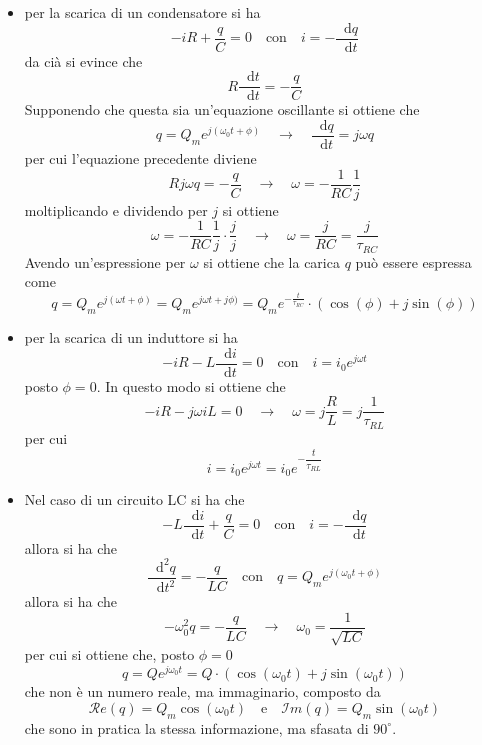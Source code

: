 \documentclass[a4paper]{extarticle}
\newcommand\dif{\mathop{}\!\mathrm{d}}
\begin{document}
\begin{itemize}
  \item per la scarica di un condensatore si ha
  \[-i R + \dfrac{q}{C} = 0 \hspace{1em} \text{con} \hspace{1em} i=-\dfrac{\dif q}{\dif t}\]
  da cià si evince che
  \[R \dfrac{\dif t}{\dif t} = - \dfrac{q}{C}\]
  Supponendo che questa sia un'equazione oscillante si ottiene che
  \[q=Q_m e^{j (\omega_0 t + \phi)} \hspace{1em} \rightarrow \hspace{1em} \dfrac{\dif q}{\dif t} = j\omega q\]
  per cui l'equazione precedente diviene
  \[R j \omega q= -\dfrac{q}{C} \hspace{1em} \rightarrow \hspace{1em} \omega=-\dfrac{1}{RC} \dfrac{1}{j}\]
  moltiplicando e dividendo per $j$ si ottiene
  \[\omega=-\dfrac{1}{RC} \dfrac{1}{j} \cdot \dfrac{j}{j} \hspace{1em} \rightarrow \hspace{1em} \omega=\dfrac{j}{RC}=\dfrac{j}{\tau_{RC}}\]
  Avendo un'espressione per $\omega$ si ottiene che la carica $q$ può essere espressa come
  \[q=Q_m e^{j(\omega t + \phi)} = Q_m e^{j\omega t + j\phi)} = Q_m e^{-\frac{t}{\tau_{RC}}} \cdot (\cos(\phi) + j \sin(\phi))\]

  \item per la scarica di un induttore si ha
  \[-iR - L \dfrac{\dif i}{\dif t} = 0 \hspace{1em} \text{con} \hspace{1em} i=i_0 e^{j \omega t}\]
  posto $\phi=0$. In questo modo si ottiene che
  \[-iR - j\omega i L = 0 \hspace{1em} \rightarrow \hspace{1em} \omega = j \dfrac{R}{L} = j \dfrac{1}{\tau_{RL}}\]
  per cui
  \[i=i_0 e^{j \omega t} = i_0 e^{-\dfrac{t}{\tau_{RL}}}\]

  \item Nel caso di un circuito LC si ha che
  \[-L \dfrac{\dif i}{\dif t} + \dfrac{q}{C} = 0 \hspace{1em} \text{con} \hspace{1em} i=-\dfrac{\dif q}{\dif t}\]
  allora si ha che
  \[\dfrac{\dif^2 q}{\dif t^2} = - \dfrac{q}{LC} \hspace{1em} \text{con} \hspace{1em} q = Q_m e^{j (\omega_0 t + \phi)}\]
  allora si ha che
  \[-\omega_0^2 q = - \dfrac{q}{LC} \hspace{1em} \rightarrow \hspace{1em} \omega_0 = \dfrac{1}{\sqrt{LC}}\]
  per cui si ottiene che, posto $\phi=0$
  \[q=Qe^{j \omega_0 t} = Q \cdot (\cos(\omega_0 t) + j \sin(\omega_0 t))\]
  che non è un numero reale, ma immaginario, composto da
  \[\mathcal{R}e(q) = Q_m \cos(\omega_0 t) \hspace{1em} \text{e} \hspace{1em} \mathcal{I}m(q) = Q_m \sin(\omega_0 t)\]
  che sono in pratica la stessa informazione, ma sfasata di $90^\circ$.
\end{itemize}
\end{document}
